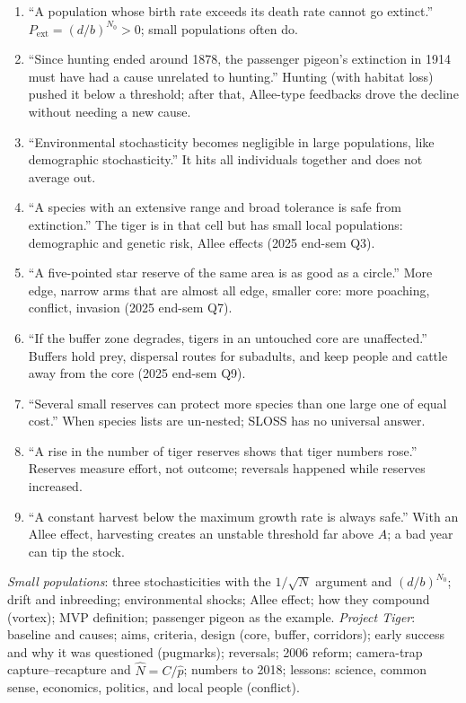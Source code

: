 \begin{statements}
\begin{enumerate}[label=\arabic*.]
\item ``A population whose birth rate exceeds its death rate cannot go extinct.''
\F $P_{\text{ext}}=(d/b)^{N_0}>0$; small populations often do.
\item ``Since hunting ended around 1878, the passenger pigeon's extinction in 1914 must have had a cause unrelated to hunting.''
\F Hunting (with habitat loss) pushed it below a threshold; after that, Allee-type feedbacks drove the decline without
needing a new cause.
\item ``Environmental stochasticity becomes negligible in large populations, like demographic stochasticity.''
\F It hits all individuals together and does not average out.
\item ``A species with an extensive range and broad tolerance is safe from extinction.''
\F The tiger is in that cell but has small local populations: demographic and genetic risk, Allee effects (2025 end-sem Q3).
\item ``A five-pointed star reserve of the same area is as good as a circle.''
\F More edge, narrow arms that are almost all edge, smaller core: more poaching, conflict, invasion (2025 end-sem Q7).
\item ``If the buffer zone degrades, tigers in an untouched core are unaffected.''
\F Buffers hold prey, dispersal routes for subadults, and keep people and cattle away from the core (2025 end-sem Q9).
\item ``Several small reserves can protect more species than one large one of equal cost.''
\T When species lists are un-nested; SLOSS has no universal answer.
\item ``A rise in the number of tiger reserves shows that tiger numbers rose.''
\F Reserves measure effort, not outcome; reversals happened while reserves increased.
\item ``A constant harvest below the maximum growth rate is always safe.''
\F With an Allee effect, harvesting creates an unstable threshold far above $A$; a bad year can tip the stock.
\end{enumerate}
\end{statements}

\begin{longans}
\emph{Small populations}: three stochasticities with the $1/\sqrt N$ argument and $(d/b)^{N_0}$; drift and inbreeding;
environmental shocks; Allee effect; how they compound (vortex); MVP definition; passenger pigeon as the example.
\emph{Project Tiger}: baseline and causes; aims, criteria, design (core, buffer, corridors); early success and why it
was questioned (pugmarks); reversals; 2006 reform; camera-trap capture--recapture and $\hat N=C/\hat p$; numbers to 2018;
lessons: science, common sense, economics, politics, and local people (conflict).
\end{longans}
